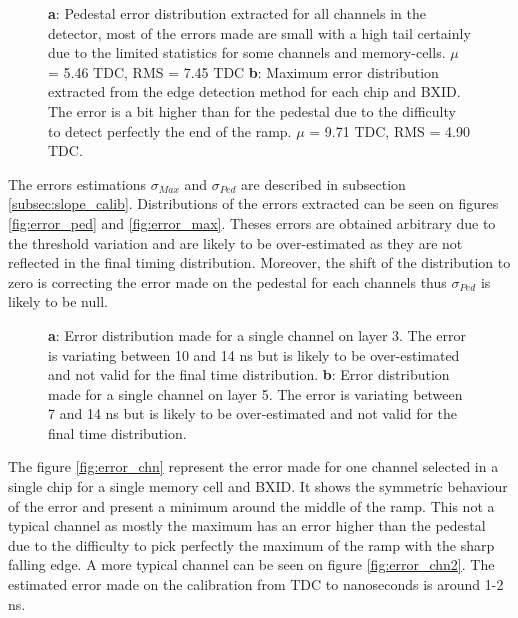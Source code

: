 \documentclass[twoside,a4paper,11pt]{article}
\begin{document}
\begin{appendix}
\begin{figure}[htbp]
	\caption[]{\textbf{a}: Pedestal error distribution extracted for all channels in the detector, most of the errors made are small with a high tail certainly due to the limited statistics for some channels and memory-cells. $\mu$ = 5.46 TDC, RMS = 7.45 TDC \textbf{b}: Maximum error distribution extracted from the edge detection method for each chip and BXID. The error is a bit higher than for the pedestal due to the difficulty to detect perfectly the end of the ramp. $\mu$ = 9.71 TDC, RMS = 4.90 TDC.}
	\label{fig:error_dist}
\end{figure}
The errors estimations $\sigma_{Max}$ and $\sigma_{Ped}$ are described in subsection \ref{subsec:slope_calib}. Distributions of the errors extracted can be seen on figures \ref{fig:error_ped} and \ref{fig:error_max}. Theses errors are obtained arbitrary due to the threshold variation and are likely to be over-estimated as they are not reflected in the final timing distribution. Moreover, the shift of the distribution to zero is correcting the error made on the pedestal for each channels thus $\sigma_{Ped}$ is likely to be null. 
\begin{figure}[htbp]
	\caption[]{\textbf{a}: Error distribution made for a single channel on layer 3. The error is variating between 10 and 14 ns but is likely to be over-estimated and not valid for the final time distribution. \textbf{b}: Error distribution made for a single channel on layer 5. The error is variating between 7 and 14 ns but is likely to be over-estimated and not valid for the final time distribution.}
	\label{fig:error_calibration}
\end{figure}
The figure \ref{fig:error_chn} represent the error made for one channel selected in a single chip for a single memory cell and BXID. It shows the symmetric behaviour of the error and present a minimum around the middle of the ramp. This not a typical channel as mostly the maximum has an error higher than the pedestal due to the difficulty to pick perfectly the maximum of the ramp with the sharp falling edge. A more typical channel can be seen on figure \ref{fig:error_chn2}.
The estimated error made on the calibration from TDC to nanoseconds is around 1-2 ns.


\end{appendix}
\end{document}
